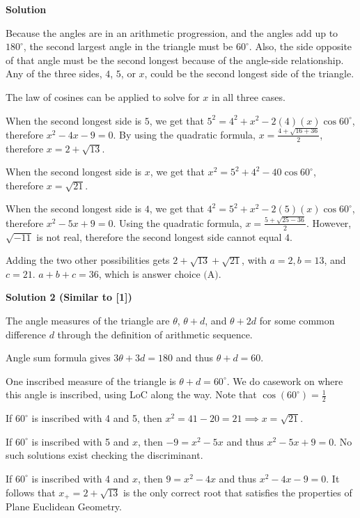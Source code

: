 \begin{enumerate}
\textbf{Solution}

Because the angles are in an arithmetic progression, and the angles add up to $180^{\circ}$, the second largest angle in the triangle must be $60^{\circ}$. Also, the side opposite of that angle must be the second longest because of the angle-side relationship. Any of the three sides, $4$, $5$, or $x$, could be the second longest side of the triangle.

 The law of cosines can be applied to solve for $x$ in all three cases.

 When the second longest side is $5$, we get that $5^2 = 4^2 + x^2 - 2(4)(x)\cos 60^{\circ}$, therefore $x^2 - 4x - 9 = 0$. By using the quadratic formula, $x = \frac {4 + \sqrt{16 + 36}}{2}$, therefore $x = 2 + \sqrt{13}$.

 When the second longest side is $x$, we get that $x^2 = 5^2 + 4^2 - 40\cos 60^{\circ}$, therefore $x = \sqrt{21}$.

 When the second longest side is $4$, we get that $4^2 = 5^2 + x^2 - 2(5)(x)\cos 60^{\circ}$, therefore $x^2 - 5x + 9 = 0$. Using the quadratic formula, $x = \frac {5 + \sqrt{25 - 36}}{2}$. However, $\sqrt{-11}$ is not real, therefore the second longest side cannot equal $4$.

 Adding the two other possibilities gets $2 + \sqrt{13} + \sqrt{21}$, with $a = 2, b=13$, and $c=21$. $a + b + c = 36$, which is answer choice $\text{(A)}$.

 



\textbf{Solution 2 (Similar to [1])}

The angle measures of the triangle are $\theta$, $\theta + d$, and $\theta + 2d$ for some common difference $d$ through the definition of arithmetic sequence.

 Angle sum formula gives $3\theta + 3d = 180$ and thus $\theta+d = 60$.

 One inscribed measure of the triangle is $\theta + d = 60^\circ$. We do casework on where this angle is inscribed, using LoC along the way. Note that $\cos(60^\circ) = \frac{1}{2}$

 If $60^\circ$ is inscribed with 4 and 5, then $x^2 = 41 - 20 = 21 \implies x = \sqrt{21}$.

 If $60^\circ$ is inscribed with 5 and $x$, then $-9 = x^2 - 5x$ and thus $x^2 - 5x +9 = 0$. No such solutions exist checking the discriminant.

 If $60^\circ$ is inscribed with 4 and $x$, then $9 = x^2 - 4x$ and thus $x^2 - 4x - 9 = 0$. It follows that $x_{+} = 2+\sqrt{13}$ is the only correct root that satisfies the properties of Plane Euclidean Geometry. 


\end{enumerate}
